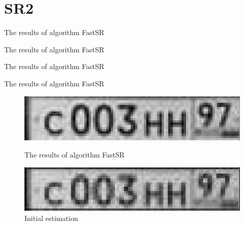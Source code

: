 \section{SR2}
\begin{frame}{The results of algorithm FastSR}
  
\end{frame}

\begin{frame}{The results of algorithm FastSR}
  
\end{frame}

\begin{frame}{The results of algorithm FastSR}
  
\end{frame}

\begin{frame}{The results of algorithm FastSR}
  \begin{figure}
    \caption{The results of algorithm FastSR}
    \includegraphics[width=\columnwidth]{content/sr2_two_1.png}\\
  \end{figure}
  \begin{figure}
    \caption{Initial estimation}
    \includegraphics[width=\columnwidth]{content/sr2_two_2.png}
  \end{figure}
\end{frame}

